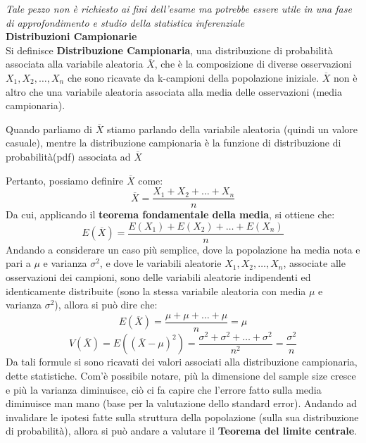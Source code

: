 \clearpage
\begin{info}\label{inf:distribuzioni-Campionarie}
\textit{Tale pezzo non è richiesto ai fini dell'esame ma potrebbe essere utile in una fase di approfondimento e studio della statistica inferenziale}
    \\
\textbf{Distribuzioni Campionarie}\\
Si definisce \textbf{Distribuzione Campionaria}, una distribuzione di probabilità associata alla variabile aleatoria \(\overline{X}\), che è la composizione di diverse osservazioni \(X_1, X_2, \dots, X_n\) che sono ricavate da k-campioni della popolazione iniziale. \(\overline{X}\) non è altro che una variabile aleatoria associata alla media delle osservazioni (media campionaria).
\begin{warn}
Quando parliamo di \(\overline{X}\) stiamo parlando della variabile aleatoria (quindi un valore casuale), mentre la distribuzione campionaria è la funzione di distribuzione di probabilità(pdf) associata ad \(\overline{X}\)
\end{warn}

Pertanto, possiamo definire \(\overline{X}\) come:
\[
\overline{X} = \frac{X_1 + X_2 + \dots + X_n}{n}
\]
Da cui, applicando il \textbf{teorema fondamentale della media}, si ottiene che:
\[
E(\overline{X}) = \frac{E(X_1) + E(X_2) + \dots + E(X_n)}{n}
\]
Andando a considerare un caso più semplice, dove la popolazione ha media nota e pari a \(\mu\) e varianza \(\sigma^2\), e dove le variabili aleatorie \(X_1, X_2, \dots, X_n\), associate alle osservazioni dei campioni, sono delle variabili aleatorie indipendenti ed identicamente distribuite (sono la stessa variabile aleatoria con media \(\mu\) e varianza \(\sigma^2\)), allora si può dire che:
\[
E(\overline{X}) = \frac{\mu + \mu + \dots + \mu}{n} = \mu
\]
\[
V(\overline{X}) = E((\overline{X} - \mu)^2) = \frac{\sigma^2 + \sigma^2 + \dots + \sigma^2}{n^2} = \frac{\sigma^2}{n}
\]
Da tali formule si sono ricavati dei valori associati alla distribuzione campionaria, dette statistiche. Com'è possibile notare, più la dimensione del sample size cresce e più la varianza diminuisce, ciò ci fa capire che l'errore fatto sulla media diminuisce man mano (base per la valutazione dello standard error).
Andando ad invalidare le ipotesi fatte sulla struttura della popolazione (sulla sua distribuzione di probabilità), allora si può andare a valutare il \textbf{Teorema del limite centrale}.
\end{info}

